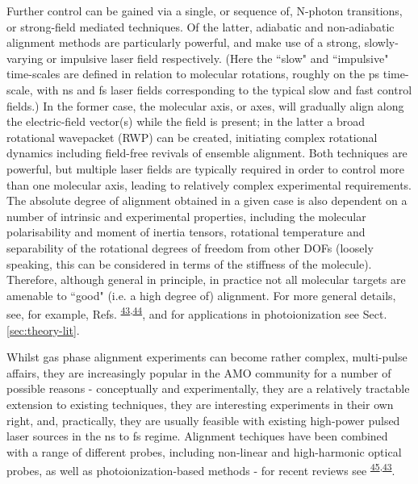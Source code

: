 \documentclass[10pt]{article}
\begin{document}
Further control can be gained via a single, or sequence of, N-photon transitions, or strong-field mediated techniques. Of the latter, adiabatic and non-adiabatic alignment methods are particularly powerful, and make use of a strong, slowly-varying or impulsive laser field respectively. (Here the ``slow" and ``impulsive" time-scales are defined in relation to molecular rotations, roughly on the ps time-scale, with ns and fs laser fields corresponding to the typical slow and fast control fields.) In the former case, the molecular axis, or axes, will gradually align along the electric-field vector(s) while the field is present; in the latter a broad rotational wavepacket (RWP) can be created, initiating complex rotational dynamics including field-free revivals of ensemble alignment. Both techniques are powerful, but multiple laser fields are typically required in order to control more than one molecular axis, leading to relatively complex experimental requirements. The absolute degree of alignment obtained in a given case is also dependent on a number of intrinsic and experimental properties, including the molecular polarisability 
and moment of inertia tensors, rotational temperature and separability of the rotational degrees of freedom from other DOFs (loosely speaking, this can be considered in terms of the stiffness of the molecule). Therefore, although general in principle, in practice not all molecular targets are amenable to ``good" (i.e. a high degree of) alignment. For more general details, see, for example, Refs. \textsuperscript{\hyperref[csl:43]{43},\hyperref[csl:44]{44}}, and for applications in photoionization see Sect. \ref{sec:theory-lit}.

Whilst gas phase alignment experiments can become rather complex, multi-pulse affairs, they are increasingly popular in the AMO community for a number of possible reasons - conceptually and experimentally, they are a relatively tractable extension to existing techniques, they are interesting experiments in their own right, and, practically, they are usually feasible with existing high-power pulsed laser sources in the ns to fs regime. Alignment techiques have been combined with a range of different probes, including non-linear and high-harmonic optical probes, as well as photoionization-based methods - for recent reviews see \textsuperscript{\hyperref[csl:45]{45},\hyperref[csl:43]{43}}. 
\end{document}
